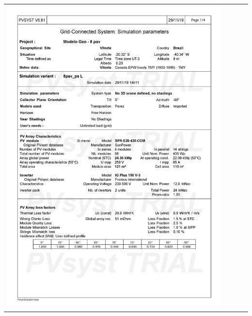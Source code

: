 \begin{table}[H]
    \centering
    \begin{tabular}{l}
        \includegraphics[width=0.9\textwidth]{figures/attachments/resultpv15.jpg}
    \end{tabular}
\end{table}
\pagebreak
